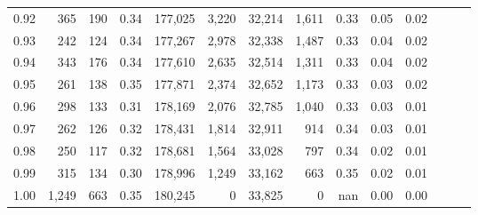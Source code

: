 \begin{tabular}{rrrrrrrrrrrrrr}
0.92 &    365 &  190 &  0.34 &  177,025 &    3,220 &  32,214 &   1,611 &  0.33 &  0.05 &      0.02 \\
0.93 &    242 &  124 &  0.34 &  177,267 &    2,978 &  32,338 &   1,487 &  0.33 &  0.04 &      0.02 \\
0.94 &    343 &  176 &  0.34 &  177,610 &    2,635 &  32,514 &   1,311 &  0.33 &  0.04 &      0.02 \\
0.95 &    261 &  138 &  0.35 &  177,871 &    2,374 &  32,652 &   1,173 &  0.33 &  0.03 &      0.02 \\
0.96 &    298 &  133 &  0.31 &  178,169 &    2,076 &  32,785 &   1,040 &  0.33 &  0.03 &      0.01 \\
0.97 &    262 &  126 &  0.32 &  178,431 &    1,814 &  32,911 &     914 &  0.34 &  0.03 &      0.01 \\
0.98 &    250 &  117 &  0.32 &  178,681 &    1,564 &  33,028 &     797 &  0.34 &  0.02 &      0.01 \\
0.99 &    315 &  134 &  0.30 &  178,996 &    1,249 &  33,162 &     663 &  0.35 &  0.02 &      0.01 \\
1.00 &  1,249 &  663 &  0.35 &  180,245 &        0 &  33,825 &       0 &   nan &  0.00 &      0.00 \\
\bottomrule
\end{tabular}
